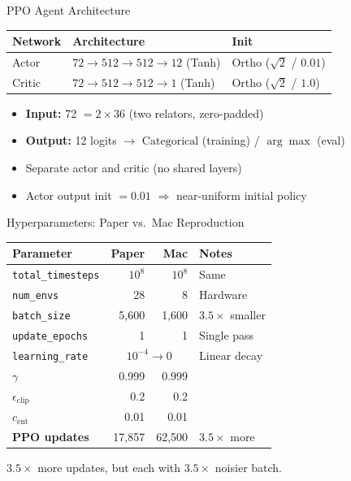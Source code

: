 \documentclass[aspectratio=169,11pt]{beamer}
\begin{document}
\begin{frame}{PPO Agent Architecture}
  \begin{center}
  \begin{tabular}{lll}
    \toprule
    \textbf{Network} & \textbf{Architecture} & \textbf{Init} \\
    \midrule
    Actor  & $72 \to 512 \to 512 \to 12$ (Tanh) & Ortho ($\sqrt{2}$ / $0.01$) \\
    Critic & $72 \to 512 \to 512 \to 1$ (Tanh)  & Ortho ($\sqrt{2}$ / $1.0$) \\
    \bottomrule
  \end{tabular}
  \end{center}

  \bigskip
  \begin{itemize}
    \item \textbf{Input:} 72 $= 2 \times 36$ (two relators, zero-padded)
    \item \textbf{Output:} 12 logits $\to$ $\mathrm{Categorical}$ (training) / $\arg\max$ (eval)
    \item Separate actor and critic (no shared layers)
    \item Actor output init $= 0.01$ $\Rightarrow$ near-uniform initial policy
  \end{itemize}
\end{frame}

\begin{frame}{Hyperparameters: Paper vs.\ Mac Reproduction}
  \small
  \begin{center}
  \begin{tabular}{lrrl}
    \toprule
    \textbf{Parameter} & \textbf{Paper} & \textbf{Mac} & \textbf{Notes} \\
    \midrule
    \texttt{total\_timesteps} & $10^8$ & $10^8$ & Same \\
    \texttt{num\_envs}        & 28     & \alert{8} & Hardware \\
    \texttt{batch\_size}      & 5{,}600 & \alert{1{,}600} & $3.5\times$ smaller \\
    \texttt{update\_epochs}   & 1      & 1      & Single pass \\
    \texttt{learning\_rate}   & \multicolumn{2}{c}{$10^{-4} \to 0$} & Linear decay \\
    $\gamma$                  & 0.999  & 0.999  & \\
    $\epsilon_\text{clip}$    & 0.2    & 0.2    & \\
    $c_\text{ent}$            & 0.01   & 0.01   & \\
    \midrule
    \textbf{PPO updates}      & 17{,}857 & \alert{62{,}500} & $3.5\times$ more \\
    \bottomrule
  \end{tabular}
  \end{center}

  \bigskip
  $3.5\times$ more updates, but each with $3.5\times$ noisier batch.
\end{frame}
\end{document}
